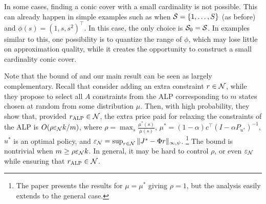 \documentclass[twocolumn]{IEEEtran}
\begin{document}
In some cases, finding a conic cover with a small cardinality is not possible. 
This can already happen in simple examples such as when $\S = \{1,\dots,S\}$ (as before) and
$\phi( s ) = (1,s,s^2)^\top$. In this case, the only choice is $\S_0 = \S$. 
In examples similar to this, one possibility is to quantize the range of $\phi$, which may lose
little on approximation quality, while it creates the opportunity 
to construct a small cardinality conic cover.

Note that the bound of \cite{CS} and our main result can be seen as largely complementary. 
Recall that \citeauthor{CS} consider adding an extra constraint $r\in \N$, while they propose to select all $A$ constraints
from the ALP corresponding to $m$ states chosen at random from some distribution $\mu$. 
Then, with high probability,
they show that, provided $\ralp \in \N$,
 the extra price paid for relaxing the constraints of the ALP is $O( \rho \epsilon_{\N} k/m)$,
 where $\rho = \max_{s} \frac{\mu^*(s)}{\mu(s)}$, $\mu^* = (1-\alpha)c^\top (I-\alpha P_{u^*})^{-1}$, $u^*$ is an optimal policy,
and $\epsilon_{\N} = \sup_{r\in \N} \norm{J^*-\Phi r}_{\infty,\psi}$.%
\footnote{The paper presents the results for $\mu = \mu^*$ giving $\rho=1$, but the analysis easily extends to the general case.}
The bound is nontrivial when $m\ge \rho \epsilon_{\N} k$.
In general, it may be hard to control $\rho$, or even $\epsilon_{\N}$ while ensuring that $\ralp \in \N$.
\end{document}
